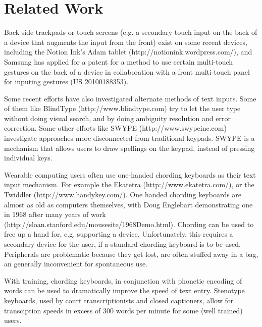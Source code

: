 \section{Related Work}

Back side trackpads or touch screens (e.g. a secondary touch input on
the back of a device that augments the input from the front) exist on
some recent devices, including the Notion Ink’s Adam tablet
(http://notionink.wordpress.com/), and Samsung has applied for a
patent for a method to use certain multi-touch gestures on the back of
a device in collaboration with a front multi-touch panel for inputing
gestures (US 20100188353).

Some recent efforts have also investigated alternate methods of text
inputs. Some of them like BlindType (http://www.blindtype.com) try to
let the user type without doing visual search, and by doing ambiguity
resolution and error correction. Some other efforts like SWYPE
(http://www.swypeinc.com) investigate approaches more disconnected
from traditional keypads. SWYPE is a mechanism that allows users to
draw spellings on the keypad, instead of pressing individual keys.

Wearable computing users often use one-handed chording keyboards as
their text input mechanism.  For example the Ekatetra
(http://www.ekatetra.com/), or the Twiddler
(http://www.handykey.com/).  One handed chording keyboards are almost
as old as computers themselves, with Doug Englebart demonstrating one
in 1968 after many years of work
(http://sloan.stanford.edu/mousesite/1968Demo.html).  Chording can be
used to free up a hand for, e.g. supporting a device.  Unfortunately,
this requires a secondary device for the user, if a standard chording
keyboard is to be used.  Peripherals are problematic because they get
lost, are often stuffed away in a bag, an generally inconvenient for
spontaneous use.

With training, chording keyboards, in conjunction with phonetic
encoding of words can be used to dramatically improve the speed of
text entry.  Stenotype keyboards, used by court transcriptionists and
closed captioners, allow for transciption speeds in excess of 300
words per minute for some (well trained) users.

